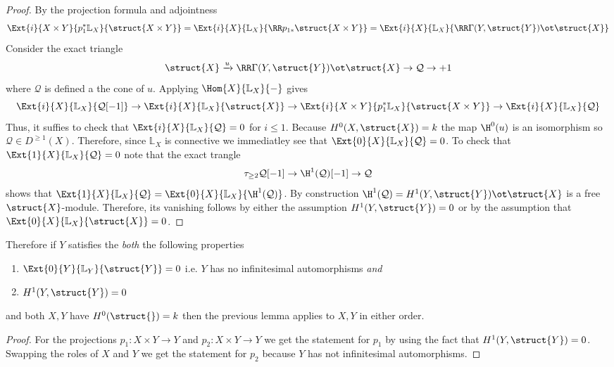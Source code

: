 \documentclass[12pt]{article}
\newcommand{\LL}{\mathbb{L}}
\begin{document}
\newcommand{\cQ}{\mathcal{Q}}

\begin{proof}
By the projection formula and adjointness
\[ \Ext{i}{X \times Y}{p_1^* \LL_X}{\struct{X \times Y}} = \Ext{i}{X}{\LL_X}{\RR p_{1*} \struct{X \times Y}} = \Ext{i}{X}{\LL_X}{\RR \Gamma(Y, \struct{Y}) \ot \struct{X}} \]
Consider the exact triangle
\[ \struct{X} \xrightarrow{u} \RR \Gamma(Y, \struct{Y}) \ot \struct{X} \to \cQ \to + 1 \]
where $\cQ$ is defined a the cone of $u$. Applying $\Hom{X}{\LL_X}{-}$ gives
\[ \Ext{i}{X}{\LL_X}{\cQ[-1]} \to \Ext{i}{X}{\LL_X}{\struct{X}} \to \Ext{i}{X \times Y}{p_1^* \LL_X}{\struct{X \times Y}} \to \Ext{i}{X}{\LL_X}{\cQ} \]
Thus, it suffies to check that $\Ext{i}{X}{\LL_X}{\cQ} = 0$ for $i \le 1$. Because $H^0(X, \struct{X}) = k$ the map $\H^0(u)$ is an isomorphism so $\cQ \in D^{\ge 1}(X)$. Therefore, since $\LL_X$ is connective we immediatley see that $\Ext{0}{X}{\LL_X}{\cQ} = 0$. To check that $\Ext{1}{X}{\LL_X}{\cQ} = 0$ note that the exact trangle
\[ \tau_{\ge 2} \cQ[-1] \to \H^1(\cQ)[-1] \to \cQ \]
shows that $\Ext{1}{X}{\LL_X}{\cQ} = \Ext{0}{X}{\LL_X}{\H^1(\cQ)}$. By construction $\H^1(\cQ) = H^1(Y, \struct{Y}) \ot \struct{X}$ is a free $\struct{X}$-module. Therefore, its vanishing follows by either the assumption $H^1(Y, \struct{Y}) = 0$ or by the assumption that $\Ext{0}{X}{\LL_X}{\struct{X}} = 0$.  
\end{proof}

\begin{cor} \label{cor:ext_product_basechange_asymmetric}
Therefore if $Y$ satisfies the \textit{both} the following properties
\begin{enumerate}
\item $\Ext{0}{Y}{\LL_Y}{\struct{Y}} = 0$ i.e. $Y$ has no infinitesimal automorphisms \textit{and}
\item $H^1(Y, \struct{Y}) = 0$
\end{enumerate}
and both $X,Y$ have $H^0(\struct{}) = k$ then the previous lemma applies to $X,Y$ in either order. 
\end{cor}

\begin{proof}
For the projections $p_1 : X \times Y \to Y$ and $p_2 : X \times Y \to Y$ we get the statement for $p_1$ by using the fact that $H^1(Y, \struct{Y}) = 0$. Swapping the roles of $X$ and $Y$ we get the statement for $p_2$ because $Y$ has not infinitesimal automorphisms. 
\end{proof}


\newcommand{\Def}{\mathrm{Def}}
\newcommand{\Art}{\mathrm{Art}}
\end{document}
